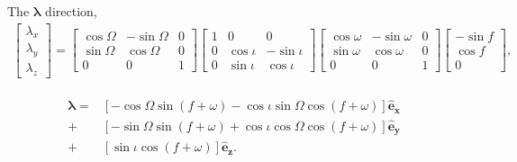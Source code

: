 The $\boldsymbol{\lambda}$ direction,
\begin{align*}
\begin{bmatrix}
\lambda_x\\
\lambda_y\\
\lambda_z\end{bmatrix}
= 
\begin{bmatrix}
\cos \Omega & -\sin \Omega & 0 \\
\sin \Omega & \cos\Omega & 0\\
0&0&1
\end{bmatrix}
\begin{bmatrix}
1&0&0\\
0&\cos \iota & -\sin \iota \\
0& \sin \iota & \cos\iota 
\end{bmatrix}
\begin{bmatrix}
\cos \omega & -\sin {\omega} & 0 \\
\sin \omega & \cos\omega & 0\\
0&0&1
\end{bmatrix}
\begin{bmatrix}
-\sin f\\
\cos f \\
0\end{bmatrix},
\end{align*}


\begin{align}
\begin{split}
	\boldsymbol{\lambda} =& [-\cos \Omega \sin (f +\omega) - \cos \iota \sin \Omega \cos (f+\omega)] \mathbf{\hat{e}_x}\\
	+& [-\sin \Omega \sin (f +\omega) + \cos \iota \cos \Omega \cos (f+\omega)] \mathbf{\hat{e}_y}\\
	+ & [ \sin \iota  \cos (f+\omega)] \mathbf{\hat{e}_z}.
	\end{split}
\label{eq: lambdaunitary}
\end{align}

